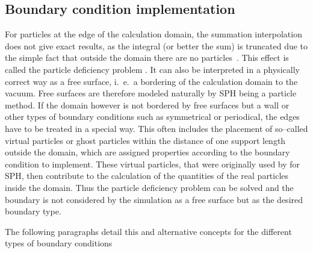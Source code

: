 \documentclass{report}
\begin{document}
\subsection{Boundary condition implementation}
\label{sec:boundaryConditionImplementation}
For particles at the edge of the calculation domain, the summation interpolation does not
give exact results, as the integral (or better the sum) is truncated due to
the simple fact that outside the domain there are no
particles~\cite{Liu2003}. This effect is called the particle deficiency problem \cite{Liu2003}. %
It can also be interpreted in a physically correct way %
as a free surface, i.\ e.\ a bordering of the calculation domain to the vacuum. Free surfaces are therefore modeled naturally by SPH being a particle method. If the domain however is not bordered by free surfaces but a wall or other types of boundary conditions such as symmetrical or periodical, the edges have to be treated in a special way. This often includes the placement of so--called virtual particles or ghost particles within the distance of one support length outside the domain, which are assigned properties according to the boundary condition to implement. These virtual particles, that were originally used by \cite{Libersky1993} for SPH, then contribute to the calculation of the quantities of the real particles inside the domain. Thus the particle deficiency problem can be solved and the boundary is not considered by the simulation as a free surface but as the desired boundary type. 

The following paragraphs detail this and alternative concepts for the different types of boundary conditions
\end{document}

